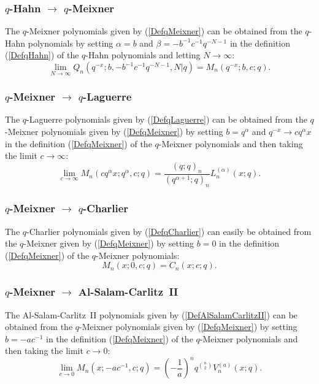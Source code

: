\documentclass[envcountchap,graybox]{svmono}
\newcounter{rom}
\begin{document}
\subsubsection*{$q$-Hahn $\rightarrow$ $q$-Meixner}
The $q$-Meixner polynomials given by (\ref{DefqMeixner}) can be obtained from the $q$-Hahn polynomials
by setting $\alpha=b$ and $\beta=-b^{-1}c^{-1}q^{-N-1}$ in the definition (\ref{DefqHahn}) of the
$q$-Hahn polynomials and letting $N\rightarrow\infty$:
$$\lim_{N\rightarrow\infty}Q_n(q^{-x};b,-b^{-1}c^{-1}q^{-N-1},N|q)=M_n(q^{-x};b,c;q).$$

\subsubsection*{$q$-Meixner $\rightarrow$ $q$-Laguerre}
The $q$-Laguerre polynomials given by (\ref{DefqLaguerre}) can be obtained
from the $q$-Meixner polynomials given by (\ref{DefqMeixner}) by setting
$b=q^{\alpha}$ and $q^{-x}\rightarrow cq^{\alpha}x$ in the definition
(\ref{DefqMeixner}) of the $q$-Meixner polynomials and then taking the limit
$c\rightarrow\infty$:
\begin{equation}
\lim_{c\rightarrow\infty}M_n(cq^{\alpha}x;q^{\alpha},c;q)=
\frac{(q;q)_n}{(q^{\alpha+1};q)_n}L_n^{(\alpha)}(x;q).
\end{equation}

\subsubsection*{$q$-Meixner $\rightarrow$ $q$-Charlier}
The $q$-Charlier polynomials given by (\ref{DefqCharlier}) can easily be
obtained from the $q$-Meixner given by (\ref{DefqMeixner}) by setting $b=0$
in the definition (\ref{DefqMeixner}) of the $q$-Meixner polynomials:
\begin{equation}
M_n(x;0,c;q)=C_n(x;c;q).
\end{equation}

\subsubsection*{$q$-Meixner $\rightarrow$ Al-Salam-Carlitz~II}
The Al-Salam-Carlitz~II polynomials given by (\ref{DefAlSalamCarlitzII})
can be obtained from the $q$-Meixner polynomials given by (\ref{DefqMeixner})
by setting $b=-ac^{-1}$ in the definition (\ref{DefqMeixner}) of the
$q$-Meixner polynomials and then taking the limit $c\rightarrow 0$:
\begin{equation}
\lim_{c\rightarrow 0}M_n(x;-ac^{-1},c;q)=
\left(-\frac{1}{a}\right)^nq^{\binom{n}{2}}V_n^{(a)}(x;q).
\end{equation}
\end{document}
